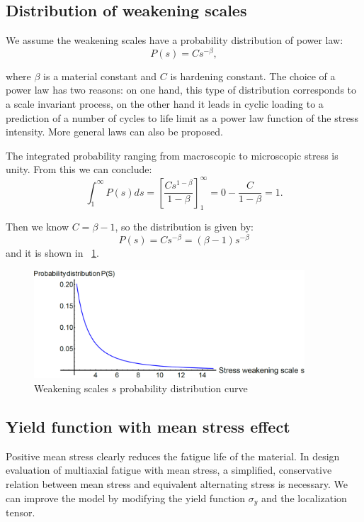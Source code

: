 \documentclass[3p,times,number,review]{elsarticle}
\newcommand{\figref}[1]{\figurename~\ref{#1}}
\begin{document}
\vspace{6pt}

\subsection{Distribution of weakening scales}

We assume the weakening scales have a  probability distribution of power law: 
$$P(s) = Cs^{-\beta},$$

where $\beta$ is a material constant and $C$ is hardening constant. 
The choice of a power law has two reasons: on one hand, this type of distribution corresponds to a scale invariant process, on the other hand it leads in cyclic loading to a prediction of a number of cycles to life limit as a power law function of the stress intensity. More general laws can also be proposed.

The integrated probability ranging from macroscopic to microscopic stress  is unity. From this we can conclude:
$$\int_{1}^{\infty}P(s)ds=\left[ \frac{Cs^{1-\beta}}{1-\beta}\right] _{1}^{\infty}=0-\frac{C}{1-\beta}=1.$$


Then we know $C=\beta-1$, so the distribution is given by:
$$P(s) = Cs^{-\beta}=(\beta-1)s^{-\beta}$$ and it is shown in \figref{ps}.
\begin{figure}[!h]
	\centering
	\includegraphics[width=0.9\textwidth]{figures//ps.png} 
	\caption{Weakening scales $s$ probability distribution curve}
	\label{ps}
\end{figure}


\subsection{Yield function with mean stress effect}

Positive mean stress clearly reduces the fatigue life of the material. In design evaluation of multiaxial fatigue with mean stress, a simplified, conservative relation between mean stress and equivalent alternating stress is necessary. We can improve the model by modifying the yield function $\sigma_y$ and the localization tensor.
\end{document}
